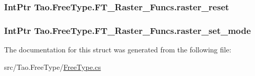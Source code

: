 \label{struct_tao_1_1_free_type_1_1_f_t___raster___funcs_a43de05ab1fa3f7f81c5ebaeb49ec22c4}
\hypertarget{struct_tao_1_1_free_type_1_1_f_t___raster___funcs_a060ff926905607670e3cb3891f29e953}{
\subsubsection[{raster\_\-reset}]{\setlength{\rightskip}{0pt plus 5cm}IntPtr {\bf Tao.FreeType.FT\_\-Raster\_\-Funcs.raster\_\-reset}}}
\label{struct_tao_1_1_free_type_1_1_f_t___raster___funcs_a060ff926905607670e3cb3891f29e953}
\hypertarget{struct_tao_1_1_free_type_1_1_f_t___raster___funcs_a068dbd394bc8379f9315de6d524dfb7b}{
\subsubsection[{raster\_\-set\_\-mode}]{\setlength{\rightskip}{0pt plus 5cm}IntPtr {\bf Tao.FreeType.FT\_\-Raster\_\-Funcs.raster\_\-set\_\-mode}}}
\label{struct_tao_1_1_free_type_1_1_f_t___raster___funcs_a068dbd394bc8379f9315de6d524dfb7b}


The documentation for this struct was generated from the following file:\begin{DoxyCompactItemize}
\item 
src/Tao.FreeType/\hyperlink{_free_type_8cs}{FreeType.cs}\end{DoxyCompactItemize}
